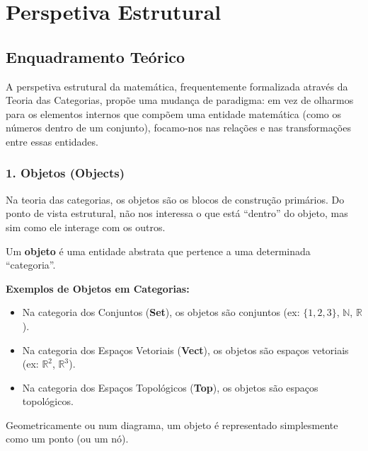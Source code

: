 
\section{Perspetiva Estrutural}

\subsection{Enquadramento Teórico}

A perspetiva estrutural da matemática, frequentemente formalizada através da Teoria das Categorias, propõe uma mudança de paradigma: em vez de olharmos para os elementos internos que compõem uma entidade matemática (como os números dentro de um conjunto), focamo-nos nas relações e nas transformações entre essas entidades.

\subsubsection*{1. Objetos (Objects)}

Na teoria das categorias, os objetos são os blocos de construção primários. Do ponto de vista estrutural, não nos interessa o que está ``dentro'' do objeto, mas sim como ele interage com os outros.

\begin{defbox}[title={Objeto}]
  Um \textbf{objeto} é uma entidade abstrata que pertence a uma determinada ``categoria''.
\end{defbox}

\textbf{Exemplos de Objetos em Categorias:}
\begin{itemize}
  \item Na categoria dos Conjuntos (\textbf{Set}), os objetos são conjuntos (ex: $\{1, 2, 3\}$, $\mathbb{N}$, $\mathbb{R}$).
  \item Na categoria dos Espaços Vetoriais (\textbf{Vect}), os objetos são espaços vetoriais (ex: $\mathbb{R}^2$, $\mathbb{R}^3$).
  \item Na categoria dos Espaços Topológicos (\textbf{Top}), os objetos são espaços topológicos.
\end{itemize}

\begin{notebox}[title={Interpretação Visual}]
  Geometricamente ou num diagrama, um objeto é representado simplesmente como um ponto (ou um nó).
\end{notebox}


